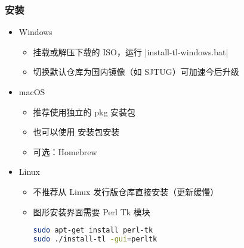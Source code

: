 \begin{frame}[fragile]
  \frametitle{安装}
  \begin{itemize}
    \item Windows
      \begin{itemize}
        \item 挂载或解压下载的 ISO，运行 |install-tl-windows.bat|
        \item 切换默认仓库为国内镜像（如 SJTUG）可加速今后升级
      \end{itemize}
    \item macOS
      \begin{itemize}
        \item 推荐使用独立的 pkg 安装包 
        \item 也可以使用 \TL 安装包安装 
        \item 可选：Homebrew 
      \end{itemize}
    \item Linux
      \begin{itemize}
        \item 不推荐从 Linux 发行版仓库直接安装（更新缓慢）
        \item 图形安装界面需要 Perl Tk 模块
          \begin{lstlisting}[language=bash]
sudo apt-get install perl-tk
sudo ./install-tl -gui=perltk
        \end{lstlisting}
      \end{itemize}
\end{itemize}
\end{frame}

